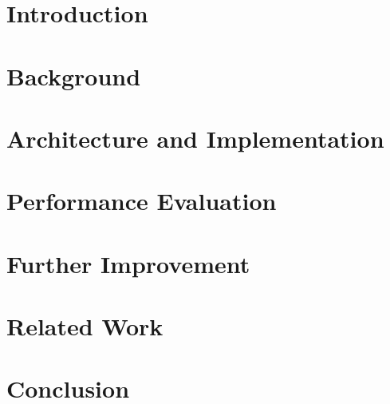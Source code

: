 
\graphicspath{{Manuscript/}}

\chapter{Introduction}


\chapter{Background}\label{chapter:Background}


\chapter{Architecture and Implementation}\label{chapter:Architecture and Implementation}



\chapter{Performance Evaluation}\label{chapter:Performance Evaluation}


\chapter{Further Improvement}\label{chapter:Further Improvement}


\chapter{Related Work}\label{chapter:Related Work}


\chapter{Conclusion}\label{chapter:Conclusion and future work}


%



